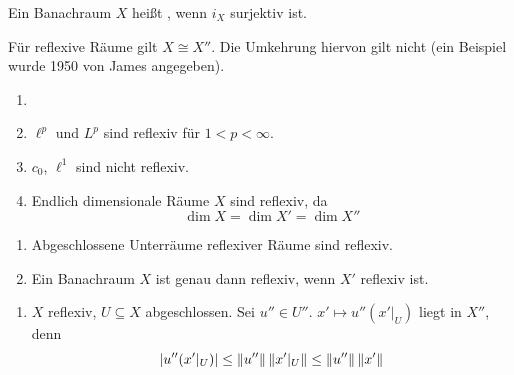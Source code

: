 \begin{definition}
	Ein Banachraum $ X $ hei\ss t , wenn $ i_X $ surjektiv ist.
\end{definition}
F\"ur reflexive R\"aume gilt $ X\cong X'' $. Die Umkehrung hiervon gilt nicht (ein Beispiel wurde 1950 von James angegeben).\\
\begin{beispiel*}
	\begin{enumerate}
		\item[]
		\item $ \ell^p $ und $ L^p $ sind reflexiv f\"ur $ 1<p<\infty $.
		\item $ c_0 $, $ \ell^1 $ sind nicht reflexiv.
		\item Endlich dimensionale R\"aume $ X $ sind reflexiv, da
		\[ \dim X=\dim X'=\dim X'' \]
	\end{enumerate}
\end{beispiel*}
\begin{satz}
	\bullshit
	\begin{enumerate}
		\item Abgeschlossene Unterr\"aume reflexiver R\"aume sind reflexiv. 
		\item Ein Banachraum $ X $ ist genau dann reflexiv, wenn $ X' $ reflexiv ist. 
	\end{enumerate}
\end{satz}
\begin{beweis}
	\begin{enumerate}
		\item $ X $ reflexiv, $ U\subseteq X $ abgeschlossen. Sei $ u''\in U'' $. $ x'\mapsto u''(x'|_U) $ liegt in $ X'' $, denn
		\[ |u''(x'|_U)|\leq\left\|u''\right\|\left\|x'|_U\right\|\leq\left\|u''\right\|\left\|x'\right\| \]
	\end{enumerate}
\end{beweis}
%
%
%
%
%
%
%
%
%
%
